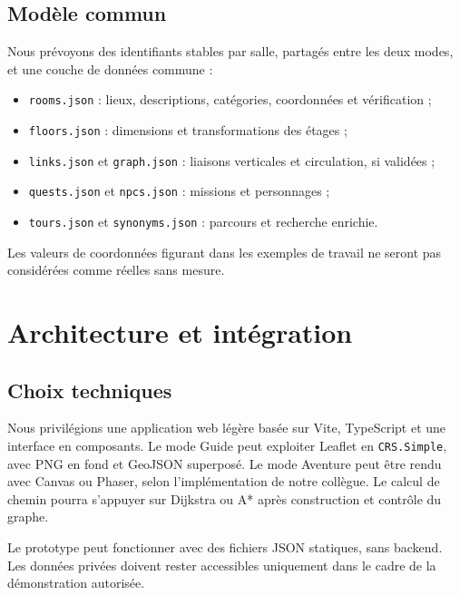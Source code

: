 \documentclass[11pt,a4paper]{article}
\begin{document}
\subsection{Modèle commun}
Nous prévoyons des identifiants stables par salle, partagés entre les deux modes, et une couche de données commune :
\begin{itemize}
\item \texttt{rooms.json} : lieux, descriptions, catégories, coordonnées et vérification ;
\item \texttt{floors.json} : dimensions et transformations des étages ;
\item \texttt{links.json} et \texttt{graph.json} : liaisons verticales et circulation, si validées ;
\item \texttt{quests.json} et \texttt{npcs.json} : missions et personnages ;
\item \texttt{tours.json} et \texttt{synonyms.json} : parcours et recherche enrichie.
\end{itemize}
Les valeurs de coordonnées figurant dans les exemples de travail ne seront pas considérées comme réelles sans mesure.

\section{Architecture et intégration}
\subsection{Choix techniques}
Nous privilégions une application web légère basée sur Vite, TypeScript et une interface en composants. Le mode Guide peut exploiter Leaflet en \texttt{CRS.Simple}, avec PNG en fond et GeoJSON superposé. Le mode Aventure peut être rendu avec Canvas ou Phaser, selon l'implémentation de notre collègue. Le calcul de chemin pourra s'appuyer sur Dijkstra ou A* après construction et contrôle du graphe.

Le prototype peut fonctionner avec des fichiers JSON statiques, sans backend. Les données privées doivent rester accessibles uniquement dans le cadre de la démonstration autorisée.
\end{document}

